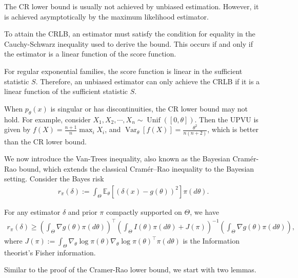 \begin{remark}
    The CR lower bound is usually not achieved by unbiased estimation. However, it is achieved asymptotically by the maximum likelihood estimator.
\end{remark}

\begin{remark}
    To attain the CRLB, an estimator must satisfy the condition for equality in the Cauchy-Schwarz inequality used to derive the bound. This occurs if and only if the estimator is a linear function of the score function.

For regular exponential families, the score function is linear in the sufficient statistic $S$. Therefore, an unbiased estimator can only achieve the CRLB if it is a linear function of the sufficient statistic $S$.
\end{remark}

\begin{remark}
    When $p_\theta(x)$ is singular or has discontinuities, the CR lower bound may not hold. For example, consider $ X_1,X_2,\cdots,X_n \sim \operatorname{Unif}([0,\theta])$. Then the UPVU is given by $f(X)=\frac{n+1}{n}\max _{i} X_i$, and $\operatorname{Var}_\theta[f(X)]=\frac{\theta^2}{n(n+2)}$, which is better than the CR lower bound.
\end{remark}


We now introduce the Van-Trees inequality, also known as the Bayesian Cramér-Rao bound, which extends the classical Cramér--Rao inequality to the Bayesian setting. Consider the Bayes risk
\begin{align*}
r_\pi(\delta):=\int_{\Theta} \mathbb{E}_\theta\left[(\delta(x)-g(\theta))^2\right] \pi(d \theta) .
\end{align*}
\begin{thm}
    For any estimator $\delta$ and prior $\pi$ compactly supported on $\Theta$, we have
\begin{align*}
r_\pi(\delta) \geq\left(\int_{\Theta} \nabla g(\theta) \pi(d \theta)\right)^{\top} \left(\int_{\Theta} I(\theta) \pi(d \theta)+J(\pi)\right)^{-1} \left(\int_{\Theta} \nabla g(\theta) \pi(d \theta)\right),
\end{align*}
where $J(\pi):=\int_{\Theta} \nabla_\theta \log \pi(\theta) \nabla_\theta \log \pi(\theta)^{\top} \pi(d \theta)$ is the Information theorist's Fisher information.
\end{thm}

Similar to the proof of the Cramer-Rao lower bound, we start with two lemmas.

